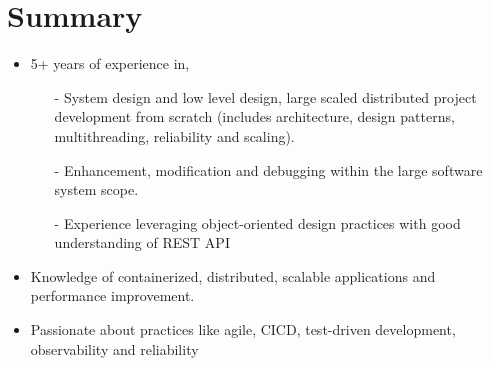 \documentclass[a4paper,12pt]{article}
\begin{document}
\section{Summary}
\begin{itemize}[nosep,after=\strut, leftmargin=1em, itemsep=3pt]
    \item 5+ years of experience in,
    \begin{itemize}
        \item[-] System design and low level design, large scaled distributed project development from scratch (includes architecture, design patterns, multithreading, reliability and scaling).
        \item[-] Enhancement, modification and debugging within the large software system scope.
        \item[-] Experience leveraging object-oriented design practices with good understanding of REST API
    \end{itemize}
    \item Knowledge of containerized, distributed, scalable applications and performance improvement.
    \item Passionate about practices like agile, CICD, test-driven development, observability and reliability
\end{itemize}

\end{document}
